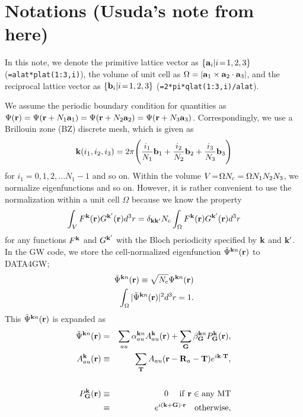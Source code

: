 \documentclass[a4paper,10pt,epsf,fleqn]{article}
\begin{document}
\section{Notations (Usuda's note from here)}
In this note, we denote the primitive lattice vector as
$\{{\bf a}_i| i\!=\!1,2,3\}$ (\verb#=alat*plat(1:3,i)#), 
the volume of unit cell as
$\Omega=|{\bf a}_1 \times {\bf a}_2 \cdot {\bf a}_3|$, and
the reciprocal lattice vector as $\{{\bf b}_i| i\!=\!1,2,3\}$
(\verb#=2*pi*qlat(1:3,i)/alat#).

We assume the periodic boundary condition for
quantities as $\Psi({\bf r}) = \Psi({\bf r}+ N_1 {\bf a}_1)
= \Psi({\bf r}+ N_2 {\bf a}_2)= \Psi({\bf r}+ N_3 {\bf a}_3)$.
Correspondingly, we use a Brillouin zone (BZ) discrete mesh, 
which is given as
\begin{eqnarray}
{\bf k}(i_1,i_2,i_3)= 2 \pi \Biggr( \frac{i_1}{N_1} {\bf b}_1 
+ \frac{i_2}{N_2} {\bf b}_2 + \frac{i_3}{N_3} {\bf b}_3 \Biggr)
\label{kmesh}
\end{eqnarray}
for $i_1=\!0,\!1,\!2,...N_1\!-\!1$ and so on.
Within the volume $V\!=\!\Omega N_{\rm c}=\Omega N_1N_2N_3$, 
we normalize eigenfunctions 
and so on. However, it is rather convenient to use 
the normalization within a unit cell $\Omega$ because we know
the property
\begin{eqnarray}
  \int_V F^{\bf k} ({\bf r}) G^{\bf k'} ({\bf r}) d^3r = \delta_{\bf k k'} 
  N_{\rm c} \int_\Omega F^{\bf k} ({\bf r}) G^{\bf k'} ({\bf r}) d^3r
\end{eqnarray}
for any functions $F^{\bf k}$ and $G^{\bf k'}$ 
with the Bloch periodicity specified by ${\bf k}$ and ${\bf k'}$.
In the GW code, we store the cell-normalized eigenfunction 
$\tilde{\Psi}^{{\bf k}n}({\bf r})$ to {\sf DATA4GW};
\begin{eqnarray}
  \tilde{\Psi}^{{\bf k}n}({\bf r}) 
  \equiv %
  \sqrt{N_{\rm c}}\Psi^{{\bf k}n}({\bf r}) \\
  \int_\Omega |\tilde{\Psi}^{{\bf k}n}({\bf r})|^2 d^3r =1.
\end{eqnarray}
This $\tilde{\Psi}^{{\bf k}n}({\bf r})$ is expanded as
\begin{eqnarray}
\hspace{-3cm}\tilde{\Psi}^{{\bf k}n}({\bf r}) 
&=& \sum_{a u} \alpha^{{\bf k} n}_{au} A^{\bf k}_{a u}({\bf r})
 + \sum_{\bf G} \beta^{{\bf k}n}_{\bf G} P^{\bf k}_{\bf G}({\bf r}), \\
A^{\bf k}_{a u}({\bf r}) &\equiv& 
          \sum_{\bf T} A_{a u}({\bf r-R}_a-{\bf T})e^{i{\bf k\cdot T}}, \\
\nonumber \\
P^{\bf k}_{\bf G}({\bf r}) &\equiv& 0  \ \ \ {\rm \ if \ {\bf r} \in any \ MT} 
\nonumber \\
        &\equiv& e^{i({\bf k+G})\cdot{\bf r}} \ \ \ {\rm otherwise},
\end{eqnarray}
\end{document}
